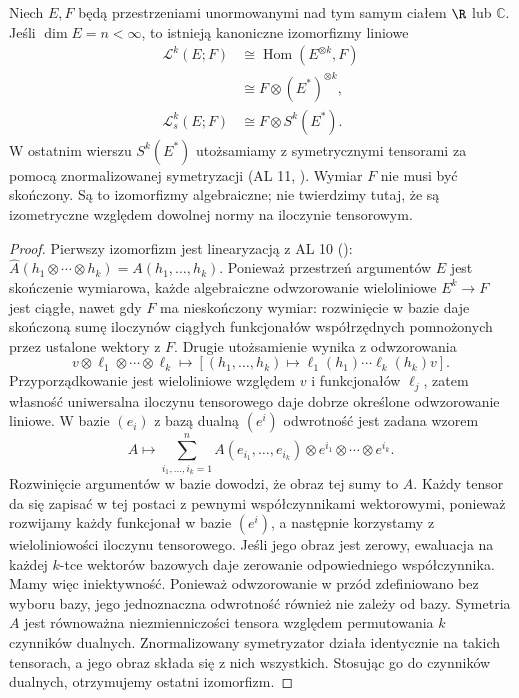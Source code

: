 \begin{twierdzenie}
\label{ma2:thm:derivative-tensor-finite}
Niech $E,F$ będą przestrzeniami unormowanymi nad tym
samym ciałem $\R$ lub $\mathbb C$. Jeśli
$\dim E=n<\infty$, to istnieją kanoniczne
izomorfizmy liniowe
\[
 \begin{aligned}
 \mathcal L^k(E;F)&\cong
 \operatorname{Hom}(E^{\otimes k},F)\\
 &\cong F\otimes(E^*)^{\otimes k},\\
 \mathcal L_s^k(E;F)&\cong
 F\otimes S^k(E^*).
 \end{aligned}
\]
W ostatnim wierszu $S^k(E^*)$ utożsamiamy
z symetrycznymi tensorami za pomocą
znormalizowanej symetryzacji (AL 11,
).
Wymiar $F$ nie musi być skończony.
Są to izomorfizmy algebraiczne; nie twierdzimy
tutaj, że są izometryczne względem dowolnej
normy na iloczynie tensorowym.
\end{twierdzenie}
\begin{proof}
Pierwszy izomorfizm jest linearyzacją z AL 10
():
$\widehat A(h_1\otimes\cdots\otimes h_k)
=A(h_1,\ldots,h_k)$.
Ponieważ przestrzeń argumentów $E$ jest skończenie
wymiarowa, każde algebraiczne odwzorowanie wieloliniowe
$E^k\to F$ jest ciągłe, nawet gdy $F$ ma nieskończony
wymiar: rozwinięcie w bazie daje skończoną sumę
iloczynów ciągłych funkcjonałów współrzędnych
pomnożonych przez ustalone wektory z $F$.
Drugie utożsamienie wynika z odwzorowania
\[
 v\otimes\ell_1\otimes\cdots\otimes\ell_k
 \longmapsto
 [(h_1,\ldots,h_k)\mapsto
      \ell_1(h_1)\cdots\ell_k(h_k)v].
\]
Przyporządkowanie jest wieloliniowe względem $v$ i funkcjonałów
$\ell_j$, zatem własność uniwersalna iloczynu tensorowego
daje dobrze określone odwzorowanie liniowe.
W bazie $(e_i)$ z bazą dualną $(e^i)$ odwrotność
jest zadana wzorem
\[
 A\longmapsto
 \sum_{i_1,\ldots,i_k=1}^n
 A(e_{i_1},\ldots,e_{i_k})\otimes
 e^{i_1}\otimes\cdots\otimes e^{i_k}.
\]
Rozwinięcie argumentów w bazie dowodzi, że
obraz tej sumy to $A$. Każdy tensor da się
zapisać w tej postaci z pewnymi współczynnikami
wektorowymi, ponieważ rozwijamy każdy funkcjonał
w bazie $(e^i)$, a następnie korzystamy z wieloliniowości
iloczynu tensorowego. Jeśli jego obraz jest zerowy,
ewaluacja na każdej $k$-tce wektorów bazowych
daje zerowanie odpowiedniego współczynnika.
Mamy więc iniektywność. Ponieważ odwzorowanie w przód
zdefiniowano bez wyboru bazy, jego jednoznaczna odwrotność
również nie zależy od bazy. Symetria $A$ jest
równoważna niezmienniczości tensora względem
permutowania $k$ czynników dualnych.
Znormalizowany symetryzator działa identycznie
na takich tensorach, a jego obraz składa się
z nich wszystkich. Stosując go do czynników
dualnych, otrzymujemy ostatni izomorfizm.
\end{proof}


